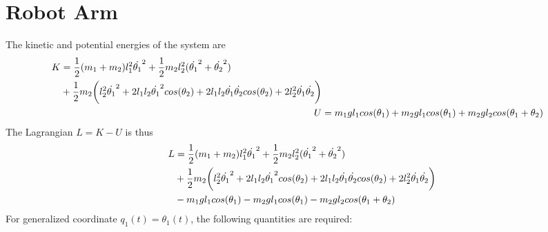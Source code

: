 \section{Robot Arm}
\label{appendix:modeling:robotarm}
The kinetic and potential energies of the system are
\begin{subequations}
\begin{align}
\begin{split}
	K &= \frac{1}{2}(m_{1} + m_{2})l_{1}^{2}\dot{\theta_{1}}^{2} +
	\frac{1}{2}m_{2}l_{2}^{2}(\dot{\theta_{1}}^{2} + \dot{\theta_{2}}^{2})
	\\
	& + \frac{1}{2}m_{2} \bigg{(} l_{2}^{2}\dot{\theta_{1}}^{2}
	+ 2l_{1}l_{2}\dot{\theta_{1}}^{2}cos(\theta_{2}) + 2l_{1}l_{2}\dot{\theta_{1}}\dot{\theta_{2}}cos(\theta_{2})
	+ 2l_{2}^{2}\dot{\theta_{1}}\dot{\theta_{2}} \bigg{)}
\end{split}
	\\
	U &= m_{1}gl_{1}cos(\theta_{1}) + m_{2}gl_{1}cos(\theta_{1}) + m_{2}gl_{2}cos(\theta_{1} + \theta_{2})
\end{align}
\end{subequations}
The Lagrangian $L = K - U$ is thus
\begin{equation}
\begin{aligned}
	L &= \frac{1}{2}(m_{1} + m_{2})l_{1}^{2}\dot{\theta_{1}}^{2} +
	\frac{1}{2}m_{2}l_{2}^{2}(\dot{\theta_{1}}^{2} + \dot{\theta_{2}}^{2})
	\\
	& + \frac{1}{2}m_{2} \bigg{(} l_{2}^{2}\dot{\theta_{1}}^{2}
	+ 2l_{1}l_{2}\dot{\theta_{1}}^{2}cos(\theta_{2}) + 2l_{1}l_{2}\dot{\theta_{1}}\dot{\theta_{2}}cos(\theta_{2})
	+ 2l_{2}^{2}\dot{\theta_{1}}\dot{\theta_{2}} \bigg{)}
	\\
	& - m_{1}gl_{1}cos(\theta_{1}) - m_{2}gl_{1}cos(\theta_{1}) - m_{2}gl_{2}cos(\theta_{1} + \theta_{2})
\end{aligned}
\end{equation}
For generalized coordinate $q_{1}(t) = \theta_{1}(t)$, the following quantities are required:
